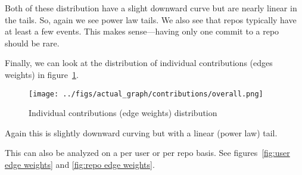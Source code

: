 \documentclass{pset}
\begin{document}
Both of these distribution have a slight downward curve but are nearly linear
in the tails.  So, again we see power law tails.
We also see that repos typically have at least a few events. 
This makes sense---having only one commit to a repo should be rare.


Finally, we can look at the distribution of individual contributions (edges weights)
in figure~\ref{fig:edge weights}.

\begin{figure}[ht]
\centering
\texttt{[image: ../figs/actual\_graph/contributions/overall.png]}
\caption{Individual contributions (edge weights) distribution}\label{fig:edge weights}
\end{figure}

Again this is slightly downward curving but with a linear (power law) tail.

This can also be analyzed on a per user or per repo basis.
See figures~\ref{fig:user edge weights} and \ref{fig:repo edge weights}.


\end{document}
